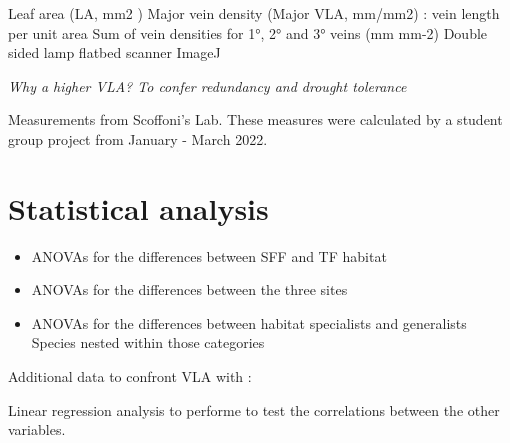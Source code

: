 \documentclass[
]{book}
\providecommand{\tightlist}{%
  \setlength{\itemsep}{0pt}\setlength{\parskip}{0pt}}
\begin{document}
Leaf area (LA, mm2 )
Major vein density (Major VLA, mm/mm2) : vein length per unit area
Sum of vein densities for 1°, 2° and 3° veins (mm mm-2)
Double sided lamp flatbed scanner
ImageJ

\emph{Why a higher VLA? To confer redundancy and drought tolerance}

Measurements from Scoffoni's Lab. These measures were calculated by a student group project from January - March 2022.

\hypertarget{statistical-analysis}{%
\section{Statistical analysis}\label{statistical-analysis}}

\begin{itemize}
\tightlist
\item
  ANOVAs for the differences between SFF and TF habitat
\item
  ANOVAs for the differences between the three sites
\item
  ANOVAs for the differences between habitat specialists and generalists
  Species nested within those categories
\end{itemize}

Additional data to confront VLA with :

Linear regression analysis to performe to test the correlations between the other variables.
\end{document}
